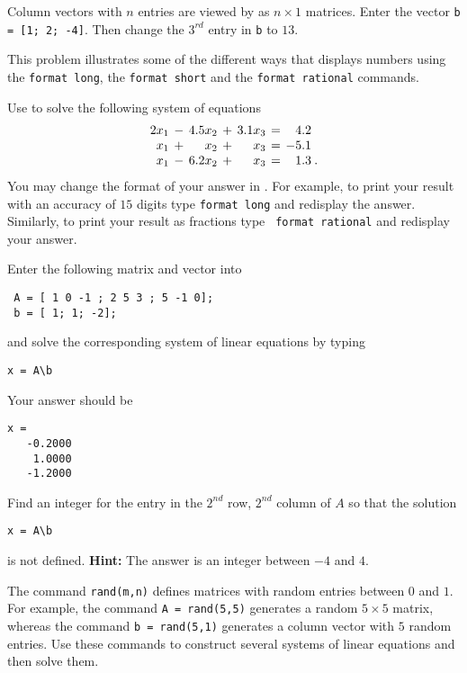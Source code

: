 \documentclass{ximera}
\begin{document}
\begin{exercise} \label{c2.1.3}
Column vectors with $n$ entries are viewed by \Matlab as
$n\times 1$ matrices.  Enter the vector {\tt b = [1; 2; -4]}.
Then change the $3^{rd}$ entry in {\tt b} to $13$.
\end{exercise}


\begin{exercise} \label{c2.1.4}
This problem illustrates some of the different ways that \Matlab
displays numbers using the {\tt format long}, the {\tt format short} and
the {\tt format rational} commands.

Use \Matlab to solve the following system of equations
\[
\arraycolsep 2pt
\begin{array}{rcrcrcrl}
 2x_1 & - & 4.5x_2 & + & 3.1x_3 & = &   4.2  & \\
  x_1 & + &  x_2 & + &  x_3 & = &  -5.1  & \\
  x_1 & - & 6.2x_2 & + &  x_3 & = &  1.3  & \! .
\end{array}
\]
You may change the format of your answer in \Matlabp.  For
example, to print your result with an accuracy of $15$ digits
type {\tt format long}  and redisplay the
answer.  Similarly, to print your result as fractions type {\tt
format rational}  and redisplay your
answer.
\end{exercise}

\begin{exercise} \label{c2.1.5}
Enter the following matrix and vector into \Matlab
\begin{verbatim}
 A = [ 1 0 -1 ; 2 5 3 ; 5 -1 0];
 b = [ 1; 1; -2];
\end{verbatim}
and solve the corresponding system of linear equations by typing
\begin{verbatim}
x = A\b
\end{verbatim}
Your answer should be
\begin{verbatim}
x =
   -0.2000
    1.0000
   -1.2000
\end{verbatim}
Find an integer for the entry in the $2^{nd}$ row, $2^{nd}$ column
of $A$ so that the solution
\begin{verbatim}
x = A\b
\end{verbatim}
is not defined.  {\bf Hint:} The answer is an integer between
$-4$ and $4$.
\end{exercise}

\begin{exercise} \label{c2.1.6}
The \Matlab command {\tt rand(m,n)} defines
matrices with random
entries between $0$ and $1$.  For example, the command {\tt A =
rand(5,5)} generates a random $5\times 5$ matrix, whereas the
command {\tt b = rand(5,1)} generates a column vector with $5$
random entries.  Use these commands to construct several systems
of linear equations and then solve them.
\end{exercise}
\end{document}
